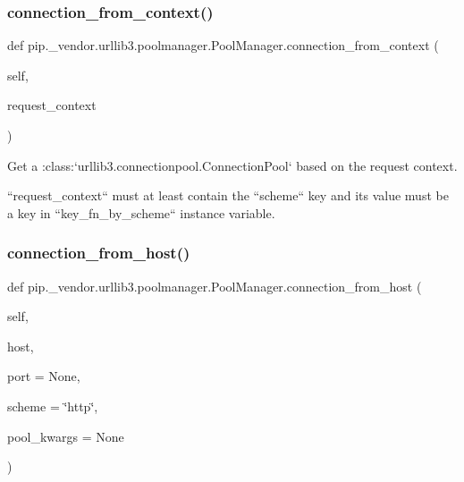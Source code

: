 \subsubsection{\texorpdfstring{connection\+\_\+from\+\_\+context()}{connection\_from\_context()}}
{\footnotesize\ttfamily def pip.\+\_\+vendor.\+urllib3.\+poolmanager.\+Pool\+Manager.\+connection\+\_\+from\+\_\+context (\begin{DoxyParamCaption}\item[{}]{self,  }\item[{}]{request\+\_\+context }\end{DoxyParamCaption})}

\begin{DoxyVerb}Get a :class:`urllib3.connectionpool.ConnectionPool` based on the request context.

``request_context`` must at least contain the ``scheme`` key and its
value must be a key in ``key_fn_by_scheme`` instance variable.
\end{DoxyVerb}
 \mbox{\label{classpip_1_1__vendor_1_1urllib3_1_1poolmanager_1_1PoolManager_a7e530a63470af62cc2ce9c7d5ceb4402}} 
\subsubsection{\texorpdfstring{connection\+\_\+from\+\_\+host()}{connection\_from\_host()}}
{\footnotesize\ttfamily def pip.\+\_\+vendor.\+urllib3.\+poolmanager.\+Pool\+Manager.\+connection\+\_\+from\+\_\+host (\begin{DoxyParamCaption}\item[{}]{self,  }\item[{}]{host,  }\item[{}]{port = {\ttfamily None},  }\item[{}]{scheme = {\ttfamily \char`\"{}http\char`\"{}},  }\item[{}]{pool\+\_\+kwargs = {\ttfamily None} }\end{DoxyParamCaption})}


